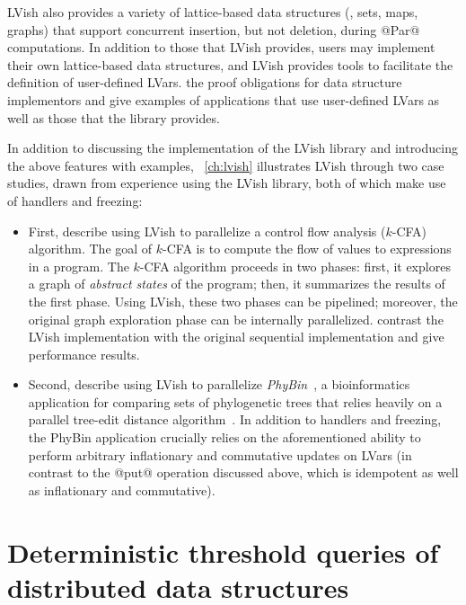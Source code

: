 LVish also provides a variety of lattice-based data structures (\eg,
sets, maps, graphs) that support concurrent insertion, but not
deletion, during @Par@ computations.  In addition to those that LVish
provides, users may implement their own lattice-based data structures,
and LVish provides tools to facilitate the definition of user-defined
LVars.   the proof obligations for data structure
implementors and give examples of applications that use user-defined
LVars as well as those that the library provides.

In addition to discussing the implementation of the LVish library and
introducing the above features with examples, ~\ref{ch:lvish}
illustrates LVish through two case studies, drawn from  experience using the LVish library, both of which
make use of handlers and freezing:
\begin{itemize}
\item First,  describe using LVish to parallelize a control flow
  analysis ($k$-CFA) algorithm.  The goal of $k$-CFA is to compute the
  flow of values to expressions in a program.  The $k$-CFA algorithm
  proceeds in two phases: first, it explores a graph of \emph{abstract
    states} of the program; then, it summarizes the results of the
  first phase.  Using LVish, these two phases can be pipelined;
  moreover, the original graph exploration phase can be internally
  parallelized.   contrast the LVish implementation with the original
  sequential implementation and give performance results.
\item Second,  describe using LVish to parallelize
  \emph{PhyBin}~\cite{PhyBin}, a bioinformatics application for
  comparing sets of phylogenetic trees that relies heavily on a
  parallel tree-edit distance algorithm~\cite{hashrf}.  In addition to
  handlers and freezing, the PhyBin application crucially relies on
  the aforementioned ability to perform arbitrary inflationary and
  commutative updates on LVars (in contrast to the @put@ operation
  discussed above, which is idempotent as well as inflationary and
  commutative).
\end{itemize}

\ifdefined\DISSERTATION
\section{Deterministic threshold queries of distributed data structures}\label{s:intro-cvrdts}

